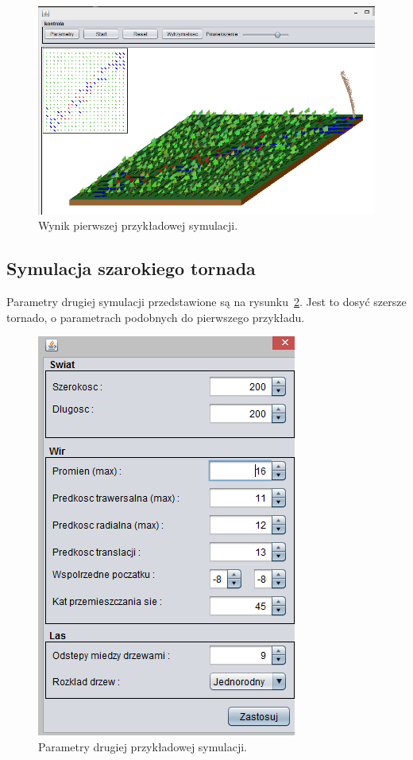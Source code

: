 \begin{figure}[!h]
	\center
	\includegraphics[scale=0.62]{test1}
	\caption{Wynik pierwszej przykładowej symulacji.}
	\label{fig:test1}
\end{figure} 

\subsection{Symulacja szarokiego tornada}

Parametry drugiej symulacji przedstawione są na rysunku~\ref{fig:test2p}. Jest to dosyć szersze tornado, o parametrach podobnych do pierwszego przykładu.

\begin{figure}[!h]
	\center
	\includegraphics[scale=0.7]{test2p}
	\caption{Parametry drugiej przykładowej symulacji.}
	\label{fig:test2p}
\end{figure} 

